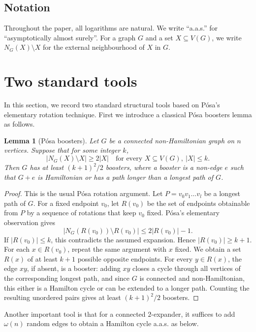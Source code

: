 \documentclass[11pt,reqno]{amsart}
\newtheorem{lemma}[theorem]{Lemma}
\theoremstyle{definition}
\theoremstyle{remark}
\renewcommand\le{\leqslant}
\renewcommand\ge{\geqslant}
\begin{document}
\subsection*{Notation}
Throughout the paper, all logarithms are natural. We write ``a.a.s.'' for ``asymptotically almost surely''. For a graph $G$ and a set $X\subseteq V(G)$, we write $N_{G}(X)\setminus X$ for the external neighbourhood of $X$ in $G$.
\medskip

\section{Two standard tools}\label{sec:tools}

In this section, we record two standard structural tools based on P\'osa's elementary rotation technique. First we introduce a classical P\'osa boosters lemma as follows.

\begin{lemma}[P\'osa boosters]\label{lem:posa}
Let $G$ be a connected non-Hamiltonian graph on $n$ vertices. Suppose that for some integer $k$,
$$|N_{G}(X)\setminus X|\ge 2|X| \quad \text{for every } X\subseteq V(G), \ |X|\le k.$$
Then $G$ has at least $(k+1)^{2}/2$ boosters, where a booster is a non-edge $e$ such that $G+e$ is Hamiltonian or has a path longer than a longest path of $G$.
\end{lemma}
\begin{proof}
This is the usual P\'osa rotation argument. Let $P=v_{0}v_{1}\dots v_{l}$ be a longest path of $G$. For a fixed endpoint $v_{0}$, let $R(v_{0})$ be the set of endpoints obtainable from $P$ by a sequence of rotations that keep $v_{0}$ fixed. P\'osa's elementary observation gives
$$|N_{G}(R(v_{0}))\setminus R(v_{0})|\le 2|R(v_{0})|-1.$$
If $|R(v_{0})|\le k$, this contradicts the assumed expansion. Hence $|R(v_{0})|\ge k+1$. For each $x\in R(v_{0})$, repeat the same argument with $x$ fixed. We obtain a set $R(x)$ of at least $k+1$ possible opposite endpoints. For every $y\in R(x)$, the edge $xy$, if absent, is a booster: adding $xy$ closes a cycle through all vertices of the corresponding longest path, and since $G$ is connected and non-Hamiltonian, this either is a Hamilton cycle or can be extended to a longer path. Counting the resulting unordered pairs gives at least $(k+1)^{2}/2$ boosters.
\end{proof}

Another important tool is that for a connected $2$-expander, it suffices to add $\omega(n)$ random edges to obtain a Hamilton cycle a.a.s. as below.
\end{document}
